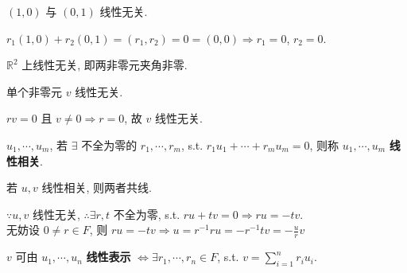 \documentclass{note}
\begin{document}
\begin{eg}
    $(1,0)$ 与 $(0,1)$ 线性无关.
\end{eg}
\begin{pf}
    $r_1(1,0)+r_2(0,1)=(r_1,r_2)=0=(0,0)\Longrightarrow r_1=0$, $r_2=0$.
\end{pf}

\begin{eg}
    $\mathbb{R}^2$ 上线性无关, 即两非零元夹角非零.
\end{eg}

单个非零元 $v$ 线性无关.
\begin{pf}
    $rv=0$ 且 $v\neq 0\Longrightarrow r=0$, 故 $v$ 线性无关.
\end{pf}

\begin{df}[线性相关]
    $u_1,\cdots,u_m$, 若 $\exists$ 不全为零的 $r_1,\cdots,r_m$, s.t. $r_1u_1+\cdots+r_mu_m=0$, 则称 $u_1,\cdots,u_m$ \textbf{线性相关}.
\end{df}

若 $u,v$ 线性相关, 则两者共线.
\begin{pf}
    $\because u,v$ 线性无关, $\therefore\exists r,t$ 不全为零, s.t. $ru+tv=0\Longrightarrow ru=-tv$.\\
    无妨设 $0\neq r\in F$, 则 $ru=-tv\Longrightarrow u=r^{-1}ru=-r^{-1}tv=-\frac{u}{r}v$
\end{pf}

\begin{df}[线性表示]
    $v$ 可由 $u_1,\cdots,u_n$ \textbf{线性表示} $\Longleftrightarrow\exists r_1,\cdots,r_n\in F$, s.t. $v=\sum_{i=1}^nr_iu_i$.
\end{df}
\end{document}
